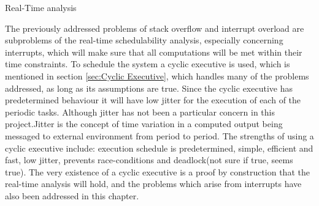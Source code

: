 Real-Time analysis 

The previously addressed problems of stack overflow and interrupt overload are subproblems of the real-time schedulability analysis, especially concerning interrupts, which will make sure that all computations will be met within their time constraints. 
To schedule the system a cyclic executive is used, which is mentioned in section \ref{sec:Cyclic Executive}, which handles many of the problems addressed, as long as its assumptions are true. 
Since the cyclic executive has predetermined behaviour it will have low jitter for the execution of each of the periodic tasks. Although jitter has not been a particular concern in this project.\newline Jitter is the concept of time variation in a computed output being messaged to external environment from period to period.
The strengths of using a cyclic executive include: execution schedule is predetermined, simple, efficient and fast, low jitter, prevents race-conditions and deadlock(not sure if true, seems true). 
The very existence of a cyclic executive is a proof by construction that the real-time analysis will hold, and the problems which arise from interrupts have also been addressed in this chapter.